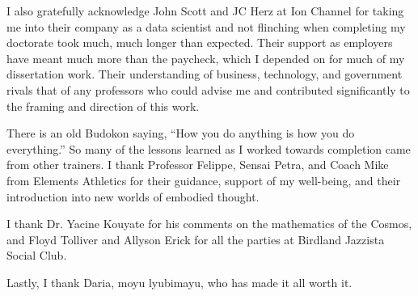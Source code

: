 \documentclass[../thesis.tex]{subfiles}
\begin{document}
 I also gratefully acknowledge John Scott and JC Herz
 at Ion Channel
 for taking me into their company as a data scientist and
 not flinching when completing my doctorate took much,
 much longer than expected.
 Their support as employers have meant much more than the paycheck,
 which I depended on for much of my dissertation work.
 Their understanding of business, technology, and government
 rivals that of any professors who could advise me
 and contributed significantly to the framing and direction
 of this work.

 There is an old Budokon saying, ``How you do anything
 is how you do everything.''
 So many of the lessons learned as I worked towards
 completion came from other trainers.
 I thank Professor Felippe, Sensai Petra, and Coach Mike
 from Elements Athletics for their guidance,
 support of my well-being, and their introduction
 into new worlds of embodied thought.

 I thank Dr. Yacine Kouyate for his comments on
 the mathematics of the Cosmos, and Floyd Tolliver
 and Allyson Erick for all the parties at
 Birdland Jazzista Social Club.
 
 Lastly, I thank Daria, moyu lyubimayu, who has
 made it all worth it.
\end{document}
